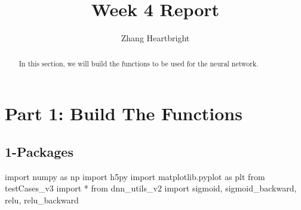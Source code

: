 \documentclass[12pt,a4paper]{article}
\title{Week 4 Report}
\author{Zhang Heartbright}
\begin{document}
	\maketitle
	\tableofcontents
	\newpage
	\section{Part 1: Build The Functions}
		\begin{abstract}
			In this section, we will build the functions to be used for the neural network.\par
		\end{abstract}
	\subsection{1-Packages}
			\begin{python}
				import numpy as np
				import h5py
				import matplotlib.pyplot as plt
				from testCases_v3 import *
				from dnn_utils_v2 import sigmoid, sigmoid_backward, relu, relu_backward
			\end{python}
	
\end{document}
